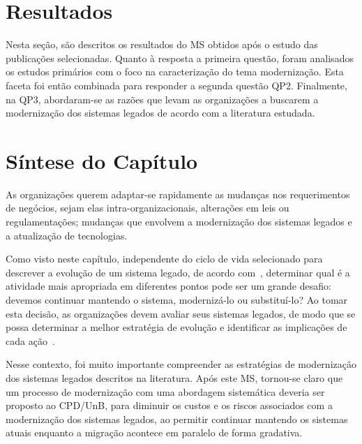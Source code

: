 


\section{Resultados}

Nesta seção, são descritos os resultados do \acrshort{MS} obtidos após o estudo das publicações selecionadas. 
Quanto à resposta a primeira questão, foram analisados os estudos primários 
com o foco na caracterização do tema modernização. Esta faceta foi então combinada para responder a 
segunda questão QP2. Finalmente, na QP3, abordaram-se as razões que levam as organizações a buscarem a 
modernização dos sistemas legados de acordo com a literatura estudada.






\section{Síntese do Capítulo}

As organizações querem 
adaptar-se rapidamente as mudanças nos requerimentos de negócios,
sejam elas intra-organizacionais, alterações em leis ou 
regulamentações; mudanças que envolvem 
a modernização dos sistemas legados e a
atualização de tecnologias.

Como visto neste capítulo, 
independente do ciclo de vida selecionado para
descrever a evolução de um sistema legado, 
de acordo com~\cite{S3_Bisbal:1999,S12_WeidermanApproaches:1997}, 
determinar qual é a atividade mais apropriada
em diferentes pontos pode ser um grande desafio: devemos
continuar mantendo o sistema, modernizá-lo ou substituí-lo?
Ao tomar esta decisão, as organizações devem avaliar seus
sistemas legados, de modo que se possa 
determinar a melhor estratégia de evolução e
identificar as implicações de cada ação~\cite{Seacord:2003}. 

Nesse contexto, foi muito importante compreender
as estratégias de modernização dos sistemas legados descritos na literatura.
Após este \acrfull{MS}, tornou-se claro que um processo de 
modernização com uma abordagem sistemática deveria ser proposto ao CPD/UnB,
para diminuir os custos e os riscos associados com a 
modernização dos sistemas legados, ao permitir continuar mantendo
os sistemas atuais enquanto a migração acontece em paralelo
de forma gradativa.
